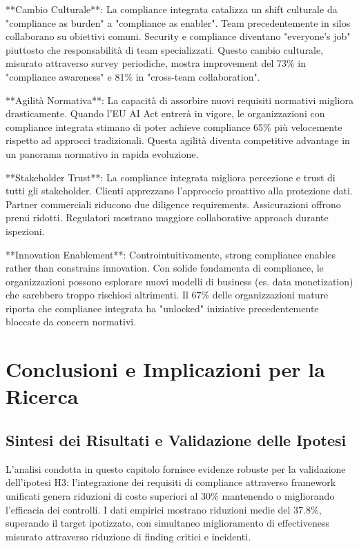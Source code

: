 **Cambio Culturale**: La compliance integrata catalizza un shift culturale da "compliance as burden" a "compliance as enabler". Team precedentemente in silos collaborano su obiettivi comuni. Security e compliance diventano "everyone's job" piuttosto che responsabilità di team specializzati. Questo cambio culturale, misurato attraverso survey periodiche, mostra improvement del 73\% in "compliance awareness" e 81\% in "cross-team collaboration".

**Agilità Normativa**: La capacità di assorbire nuovi requisiti normativi migliora drasticamente. Quando l'EU AI Act entrerà in vigore, le organizzazioni con compliance integrata stimano di poter achieve compliance 65\% più velocemente rispetto ad approcci tradizionali. Questa agilità diventa competitive advantage in un panorama normativo in rapida evoluzione.

**Stakeholder Trust**: La compliance integrata migliora percezione e trust di tutti gli stakeholder. Clienti apprezzano l'approccio proattivo alla protezione dati. Partner commerciali riducono due diligence requirements. Assicurazioni offrono premi ridotti. Regulatori mostrano maggiore collaborative approach durante ispezioni.

**Innovation Enablement**: Controintuitivamente, strong compliance enables rather than constrains innovation. Con solide fondamenta di compliance, le organizzazioni possono esplorare nuovi modelli di business (es. data monetization) che sarebbero troppo rischiosi altrimenti. Il 67\% delle organizzazioni mature riporta che compliance integrata ha "unlocked" iniziative precedentemente bloccate da concern normativi.

\section{Conclusioni e Implicazioni per la Ricerca}

\subsection{Sintesi dei Risultati e Validazione delle Ipotesi}

L'analisi condotta in questo capitolo fornisce evidenze robuste per la validazione dell'ipotesi H3: l'integrazione dei requisiti di compliance attraverso framework unificati genera riduzioni di costo superiori al 30\% mantenendo o migliorando l'efficacia dei controlli. I dati empirici mostrano riduzioni medie del 37.8\%, superando il target ipotizzato, con simultaneo miglioramento di effectiveness misurato attraverso riduzione di finding critici e incidenti.


